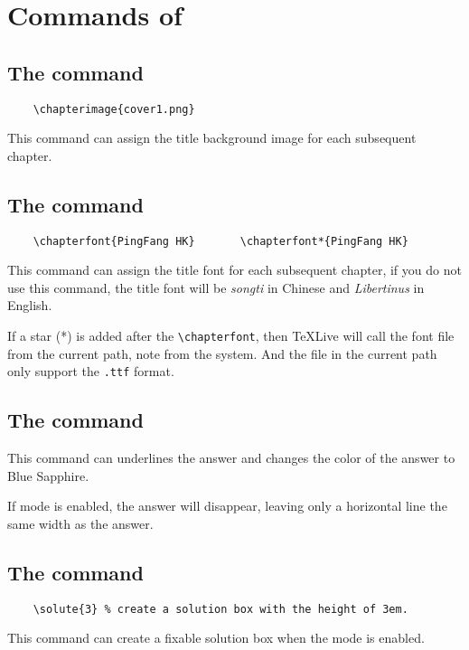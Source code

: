 \section{Commands of }
\subsection{The  command}
\begin{verbatim}
    \chapterimage{cover1.png}
\end{verbatim}

This command can assign the title background image for each subsequent chapter.

\subsection{The  command}
\begin{verbatim}
    \chapterfont{PingFang HK}       \chapterfont*{PingFang HK}
\end{verbatim}

This command can assign the title font for each subsequent chapter, if you do not use this command, the title font will be \emph{songti} in Chinese and \emph{Libertinus} in English.

If a star (*) is added after the \verb|\chapterfont|, then \TeX Live will call the font file from the current path, note from the system. And the file in the current path only support the \verb|.ttf| format.

\subsection{The  command}
This command can underlines the answer and changes the color of the answer to \textcolor{H5}{Blue Sapphire}.

If mode  is enabled, the answer will disappear, leaving only a horizontal line the same width as the answer.

\subsection{The  command}
\begin{verbatim}
    \solute{3} % create a solution box with the height of 3em.
\end{verbatim}

This command can create a fixable solution box when the mode  is enabled.

